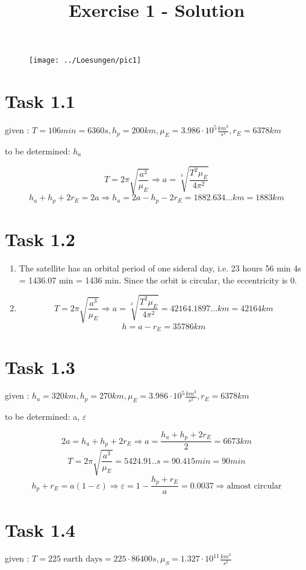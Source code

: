 \documentclass[a4paper,12pt]{article}
\title{Exercise 1 - Solution}
\author{}
\date{}
\begin{document}
\maketitle

\begin{figure}[!ht]
 \centering
 \texttt{[image: ../Loesungen/pic1]}
\end{figure}

\section*{Task 1.1}

given : $T = 106min = 6360s, h_p = 200km, \mu_E = 3.986\cdot 10^5 \frac{km^3}{s^2}, r_E = 6378km$

\noindent to be determined: $h_a$

\[ T = 2\pi\sqrt{\frac{a^3}{\mu_E}} \Rightarrow a = \sqrt[3]{\frac{T^2\mu_E}{4\pi^2}}\]
\[h_a + h_p + 2r_E = 2a \Rightarrow h_a = 2a - h_p - 2r_E = 1882.634... km = 1883km \]


\section*{Task 1.2}

\begin{enumerate}
 \item The satellite has an orbital period of one sideral day, i.e. 23 hours 56 min 4s = 1436.07 min = 1436 min. Since the orbit is circular, the eccentricity is 0.
 \item \[ T = 2\pi\sqrt{\frac{a^3}{\mu_E}} \Rightarrow a = \sqrt[3]{\frac{T^2\mu_E}{4\pi^2}} = 42164.1897... km = 42164 km\]
 \[h = a - r_E = 35786km \]
\end{enumerate}

\section*{Task 1.3}
given : $h_a = 320km, h_p = 270km, \mu_E = 3.986\cdot 10^5 \frac{km^3}{s^2}, r_E = 6378km$

\noindent to be determined: a, $\varepsilon$

\[ 2a = h_a + h_p + 2r_E \Rightarrow a = \frac{h_a + h_p + 2r_E}{2} = 6673km \]
\[ T = 2\pi\sqrt{\frac{a^3}{\mu_E}} = 5424.91..s = 90.415min = 90 min\]
\[h_p + r_E = a(1-\varepsilon) \Rightarrow \varepsilon = 1 - \frac{h_p + r_E}{a} = 0.0037 \Rightarrow \text{almost circular}\] 

\section*{Task 1.4}
given : $T = 225 \text{ earth days} = 225\cdot 86400s, \mu_S = 1.327\cdot 10^{11} \frac{km^3}{s^2}$
\end{document}
